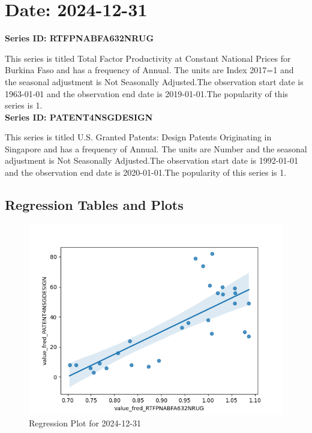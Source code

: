 \section{Date: 2024-12-31}
\noindent \textbf{Series ID: RTFPNABFA632NRUG} 

\noindent This series is titled Total Factor Productivity at Constant National Prices for Burkina Faso and has a frequency of Annual. The units are Index 2017=1 and the seasonal adjustment is Not Seasonally Adjusted.The observation start date is 1963-01-01 and the observation end date is 2019-01-01.The popularity of this series is 1. \\ 

\noindent \textbf{Series ID: PATENT4NSGDESIGN} 

\noindent This series is titled U.S. Granted Patents: Design Patents Originating in Singapore and has a frequency of Annual. The units are Number and the seasonal adjustment is Not Seasonally Adjusted.The observation start date is 1992-01-01 and the observation end date is 2020-01-01.The popularity of this series is 1. \\ 

\subsection{Regression Tables and Plots}


\begin{figure}
\centering
\includegraphics[scale = 0.9]{plots/plot_2024-12-31.png}
\caption{Regression Plot for 2024-12-31}
\end{figure}
\newpage
